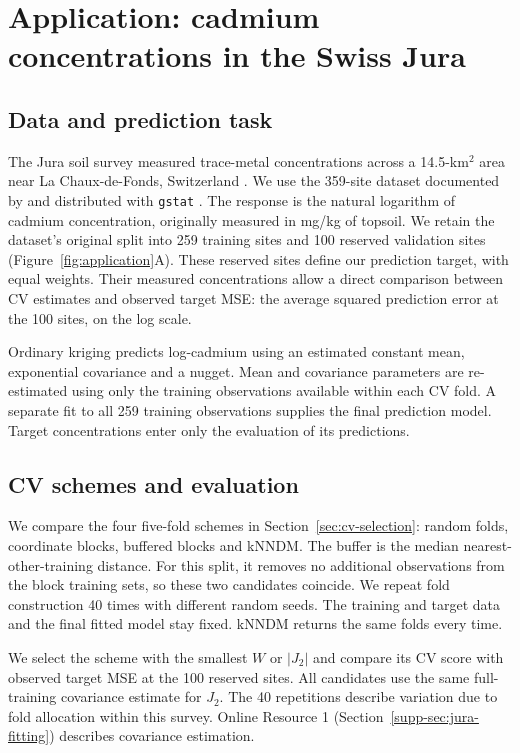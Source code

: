 \section{Application: cadmium concentrations in the Swiss Jura}
\label{sec:application}
\subsection{Data and prediction task}
The Jura soil survey measured trace-metal concentrations across a 14.5-km$^2$ area near La Chaux-de-Fonds, Switzerland \citep{atteia1994jura}. We use the 359-site dataset documented by \citet{goovaerts1997geostatistics} and distributed with \texttt{gstat} \citep{pebesma2004gstat}. The response is the natural logarithm of cadmium concentration, originally measured in mg/kg of topsoil. We retain the dataset's original split into 259 training sites and 100 reserved validation sites (Figure~\ref{fig:application}A). These reserved sites define our prediction target, with equal weights. Their measured concentrations allow a direct comparison between CV estimates and observed target MSE: the average squared prediction error at the 100 sites, on the log scale.

Ordinary kriging predicts log-cadmium using an estimated constant mean, exponential covariance and a nugget. Mean and covariance parameters are re-estimated using only the training observations available within each CV fold. A separate fit to all 259 training observations supplies the final prediction model. Target concentrations enter only the evaluation of its predictions.

\subsection{CV schemes and evaluation}
We compare the four five-fold schemes in Section~\ref{sec:cv-selection}: random folds, coordinate blocks, buffered blocks and kNNDM. The buffer is the median nearest-other-training distance. For this split, it removes no additional observations from the block training sets, so these two candidates coincide. We repeat fold construction 40 times with different random seeds. The training and target data and the final fitted model stay fixed. kNNDM returns the same folds every time.

We select the scheme with the smallest $W$ or $|J_2|$ and compare its CV score with observed target MSE at the 100 reserved sites. All candidates use the same full-training covariance estimate for $J_2$. The 40 repetitions describe variation due to fold allocation within this survey. Online Resource 1 (Section~\ref*{supp-sec:jura-fitting}) describes covariance estimation.

